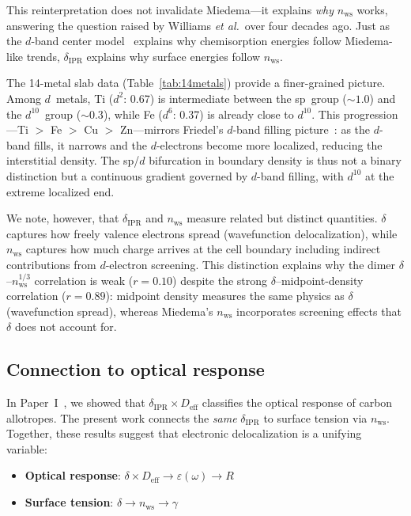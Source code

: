 \documentclass[twocolumn,showpacs,preprintnumbers,amsmath,amssymb,prb]{revtex4-2}
\begin{document}
This reinterpretation does not invalidate Miedema---it
explains \emph{why} $n_\mathrm{ws}$ works, answering the
question raised by Williams \textit{et al.}\ over four
decades ago.
Just as the $d$-band center model~\cite{Hammer1995}
explains why chemisorption energies follow Miedema-like
trends, $\delta_\mathrm{IPR}$ explains why surface energies
follow $n_\mathrm{ws}$.

The 14-metal slab data (Table~\ref{tab:14metals}) provide
a finer-grained picture.
Among $d$~metals, Ti ($d^2$: 0.67) is intermediate between
the sp~group ($\sim\!1.0$) and the $d^{10}$~group ($\sim\!0.3$),
while Fe ($d^6$: 0.37) is already close to $d^{10}$.
This progression---Ti $>$ Fe $>$ Cu $>$ Zn---mirrors
Friedel's $d$-band filling picture~\cite{Friedel1969}:
as the $d$-band fills, it narrows and the $d$-electrons
become more localized, reducing the interstitial density.
The sp/$d$ bifurcation in boundary density is thus not a
binary distinction but a continuous gradient governed by
$d$-band filling, with $d^{10}$ at the extreme localized end.

We note, however, that $\delta_\mathrm{IPR}$ and
$n_\mathrm{ws}$ measure related but distinct quantities.
$\delta$ captures how freely valence electrons spread
(wavefunction delocalization), while $n_\mathrm{ws}$ captures
how much charge arrives at the cell boundary including
indirect contributions from $d$-electron screening.
This distinction explains why the dimer
$\delta$--$n_\mathrm{ws}^{1/3}$ correlation is weak ($r = 0.10$)
despite the strong $\delta$--midpoint-density correlation
($r = 0.89$): midpoint density measures the same physics
as $\delta$ (wavefunction spread), whereas Miedema's
$n_\mathrm{ws}$ incorporates screening effects that
$\delta$ does not account for.

\subsection{Connection to optical response}

In Paper~I~\cite{SentoOpticsPaper1}, we showed that
$\delta_\mathrm{IPR} \times D_\mathrm{eff}$ classifies
the optical response of carbon allotropes.
The present work connects the \emph{same} $\delta_\mathrm{IPR}$
to surface tension via $n_\mathrm{ws}$.
Together, these results suggest that electronic delocalization
is a unifying variable:

\begin{itemize}
  \item \textbf{Optical response}:
    $\delta \times D_\mathrm{eff} \to \varepsilon(\omega) \to R$
  \item \textbf{Surface tension}:
    $\delta \to n_\mathrm{ws} \to \gamma$
\end{itemize}
\end{document}
